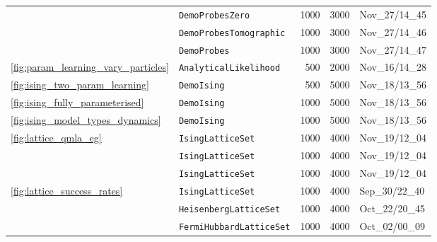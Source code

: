 \begin{tabular}{llrrl}
                                 & \texttt{DemoProbesZero} &                                     1000 &                                     3000 &                           Nov\_27/14\_45 \\
                                 & \texttt{DemoProbesTomographic} &                                     1000 &                                     3000 &                           Nov\_27/14\_46 \\
                                 & \texttt{DemoProbes} &                                     1000 &                                     3000 &                           Nov\_27/14\_47 \\
\cline{1-5}
\cref{fig:param_learning_vary_particles} & \texttt{AnalyticalLikelihood} &                                      500 &                                     2000 &                           Nov\_16/14\_28 \\
\cref{fig:ising_two_param_learning} & \texttt{DemoIsing} &                                      500 &                                     5000 &                           Nov\_18/13\_56 \\
\cref{fig:ising_fully_parameterised} & \texttt{DemoIsing} &                                     1000 &                                     5000 &                           Nov\_18/13\_56 \\
\cref{fig:ising_model_types_dynamics} & \texttt{DemoIsing} &                                     1000 &                                     5000 &                           Nov\_18/13\_56 \\
\multirow{3}{*}{\cref{fig:lattice_qmla_eg}} & \texttt{IsingLatticeSet} &                                     1000 &                                     4000 &                           Nov\_19/12\_04 \\
                                 & \texttt{IsingLatticeSet} &                                     1000 &                                     4000 &                           Nov\_19/12\_04 \\
                                 & \texttt{IsingLatticeSet} &                                     1000 &                                     4000 &                           Nov\_19/12\_04 \\
\cline{1-5}
\multirow{3}{*}{\cref{fig:lattice_success_rates}} & \texttt{IsingLatticeSet} &                                     1000 &                                     4000 &                           Sep\_30/22\_40 \\
                                 & \texttt{HeisenbergLatticeSet} &                                     1000 &                                     4000 &                           Oct\_22/20\_45 \\
                                 & \texttt{FermiHubbardLatticeSet} &                                     1000 &                                     4000 &                           Oct\_02/00\_09 \\
\hline
\end{tabular}
